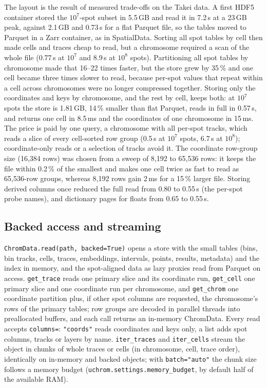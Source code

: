 \documentclass[11pt]{article}
\newcommand{\pkg}[1]{\texttt{#1}}
\begin{document}
The layout is the result of measured trade-offs on the Takei data.
A first HDF5 container stored the $10^{7}$-spot subset in 5.5\,GB and read it in 7.2\,s at a 23\,GB peak, against 2.1\,GB and 0.73\,s for a flat Parquet file, so the tables moved to Parquet in a Zarr container, as in SpatialData.
Sorting all spot tables by cell then made cells and traces cheap to read, but a chromosome required a scan of the whole file (0.77\,s at $10^{7}$ and 8.9\,s at $10^{8}$ spots).
Partitioning all spot tables by chromosome made that 16--22 times faster, but the store grew by 35\,\% and one cell became three times slower to read, because per-spot values that repeat within a cell across chromosomes were no longer compressed together.
Storing only the coordinates and keys by chromosome, and the rest by cell, keeps both: at $10^{7}$ spots the store is 1.81\,GB, 14\,\% smaller than flat Parquet, reads in full in 0.57\,s, and returns one cell in 8.5\,ms and the coordinates of one chromosome in 15\,ms.
The price is paid by one query, a chromosome with all per-spot tracks, which reads a slice of every cell-sorted row group (0.5\,s at $10^{7}$ spots, 6.7\,s at $10^{8}$); coordinate-only reads or a selection of tracks avoid it.
The coordinate row-group size (16,384 rows) was chosen from a sweep of 8,192 to 65,536 rows: it keeps the file within 0.2\,\% of the smallest and makes one cell twice as fast to read as 65,536-row groups, whereas 8,192 rows gain 2\,ms for a 15\,\% larger file.
Storing derived columns once reduced the full read from 0.80 to 0.55\,s (the per-spot probe names), and dictionary pages for floats from 0.65 to 0.55\,s.

\subsection*{Backed access and streaming}
\pkg{ChromData.read(path, backed=True)} opens a store with the small tables (bins, bin tracks, cells, traces, embeddings, intervals, points, results, metadata) and the index in memory, and the spot-aligned data as lazy proxies read from Parquet on access.
\pkg{get\_trace} reads one primary slice and its coordinate run, \pkg{get\_cell} one primary slice and one coordinate run per chromosome, and \pkg{get\_chrom} one coordinate partition plus, if other spot columns are requested, the chromosome's rows of the primary tables; row groups are decoded in parallel threads into preallocated buffers, and each call returns an in-memory ChromData.
Every read accepts \pkg{columns=}: \pkg{"coords"} reads coordinates and keys only, a list adds spot columns, tracks or layers by name.
\pkg{iter\_traces} and \pkg{iter\_cells} stream the object in chunks of whole traces or cells (in chromosome, cell, trace order), identically on in-memory and backed objects; with \pkg{batch="auto"} the chunk size follows a memory budget (\pkg{uchrom.settings.memory\_budget}, by default half of the available RAM).
\end{document}
